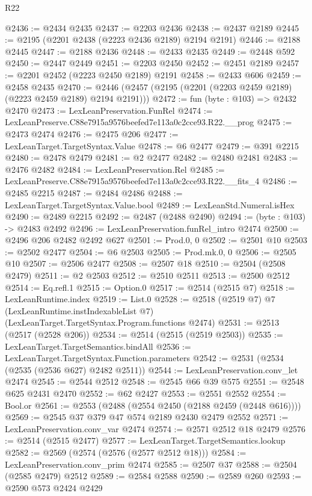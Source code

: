 \begin{lexlean}{R22}
\begin{coremodule}
@2436 := @2434 @2435
@2437 := @2203 @2436
@2438 := @2437 @2189
@2445 := @2195 (@2201 @2438 (@2223 @2436 @2189) @2194 @2191)
@2446 := @2188 @2445
@2447 := @2188 @2436
@2448 := @2433 @2435
@2449 := @2448 @592
@2450 := @2447 @2449
@2451 := @2203 @2450
@2452 := @2451 @2189
@2457 := @2201 @2452 (@2223 @2450 @2189) @2191
@2458 := @2433 @606
@2459 := @2458 @2435
@2470 := @2446 (@2457 (@2195 (@2201 (@2203 @2459 @2189) (@2223 @2459 @2189) @2194 @2191)))
@2472 := fun (byte : @103) => @2432 @2470
@2473 := LexLeanPreservation.FunRel
@2474 := LexLeanPreserve.C88e7915a9576beefed7e113a0c2cce93.R22.__prog
@2475 := @2473 @2474
@2476 := @2475 @206
@2477 := LexLeanTarget.TargetSyntax.Value
@2478 := @6 @2477
@2479 := @391 @2215
@2480 := @2478 @2479
@2481 := @2 @2477
@2482 := @2480 @2481
@2483 := @2476 @2482
@2484 := LexLeanPreservation.Rel
@2485 := LexLeanPreserve.C88e7915a9576beefed7e113a0c2cce93.R22.__fits_4
@2486 := @2485 @2215
@2487 := @2484 @2486
@2488 := LexLeanTarget.TargetSyntax.Value.bool
@2489 := LexLeanStd.Numeral.isHex
@2490 := @2489 @2215
@2492 := @2487 (@2488 @2490)
@2494 := (byte : @103) -> @2483 @2492
@2496 := LexLeanPreservation.funRel_intro @2474
@2500 := @2496 @206 @2482 @2492 @627
@2501 := Prod.{0, 0}
@2502 := @2501 @10
@2503 := @2502 @2477
@2504 := @6 @2503
@2505 := Prod.mk.{0, 0}
@2506 := @2505 @10
@2507 := @2506 @2477
@2508 := @2507 @18
@2510 := @2504 (@2508 @2479)
@2511 := @2 @2503
@2512 := @2510 @2511
@2513 := @2500 @2512
@2514 := Eq.refl.{1}
@2515 := Option.{0}
@2517 := @2514 (@2515 @7)
@2518 := LexLeanRuntime.index
@2519 := List.{0}
@2528 := @2518
    (@2519 @7)
    @7
    (LexLeanRuntime.instIndexableList @7)
    (LexLeanTarget.TargetSyntax.Program.functions @2474)
@2531 := @2513 (@2517 (@2528 @206))
@2534 := @2514 (@2515 (@2519 @2503))
@2535 := LexLeanTarget.TargetSemantics.bindAll
@2536 := LexLeanTarget.TargetSyntax.Function.parameters
@2542 := @2531 (@2534 (@2535 (@2536 @627) @2482 @2511))
@2544 := LexLeanPreservation.conv_let @2474
@2545 := @2544 @2512
@2548 := @2545 @66 @39 @575
@2551 := @2548 @625 @2431 @2470
@2552 := @62 @2427
@2553 := @2551 @2552
@2554 := Bool.or
@2561 := @2553 (@2488 (@2554 @2450 (@2188 @2459 (@2448 @616))))
@2569 := @2545 @37 @379 @47 @574 @2189 @2430 @2479 @2552
@2571 := LexLeanPreservation.conv_var @2474
@2574 := @2571 @2512 @18 @2479
@2576 := @2514 (@2515 @2477)
@2577 := LexLeanTarget.TargetSemantics.lookup
@2582 := @2569 (@2574 (@2576 (@2577 @2512 @18)))
@2584 := LexLeanPreservation.conv_prim @2474
@2585 := @2507 @37
@2588 := @2504 (@2585 @2479) @2512
@2589 := @2584 @2588
@2590 := @2589 @260
@2593 := @2590 @573 @2424 @2429

\end{coremodule}
\end{lexlean}
